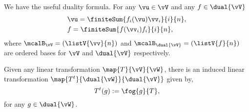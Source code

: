\begin{Remark}
    We have the useful duality formula. For any $\vu \in \vV$ and any $f \in \dual{\vV}$
    \begin{align*}
	& \vu = \finiteSum{f_i(\vu)\vv_{i}}{i}{n},\\
	& f = \finiteSum{f(\vv_{i})f_i}{i}{n},
    \end{align*}
    where $\mcalB_{\vV} = \left(\listV{\vv}{n}\right)$ and $\mcalB_{\dual{\vV}} = \left(\listV{f}{n}\right)$
    are ordered bases for $\vV$ and $\dual{\vV}$ respectively.
\end{Remark}
\begin{Definition}[name=Transpose map]
Given any linear transformation $\map{T}{\vV}{\vW}$, there is an induced linear transformation
$\map{T^{t}}{\dual{\vW}}{\dual{\vV}}$ given by,
\[T^{t}(g) := \fog{g}{T},\]
for any $g \in \dual{\vW}$.
\end{Definition}

